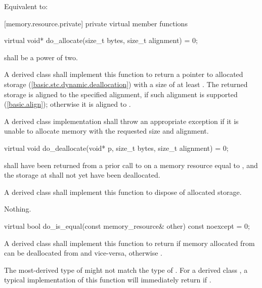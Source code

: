 \begin{itemdescr}
\pnum
\effects
Equivalent to: 
\end{itemdescr}


[memory.resource.private]{ private virtual member functions}

%
\begin{itemdecl}
virtual void* do_allocate(size_t bytes, size_t alignment) = 0;
\end{itemdecl}

\begin{itemdescr}
\pnum
\requires
{} shall be a power of two.

\pnum
\returns
A derived class shall implement this function to return a pointer to allocated storage (\ref{basic.stc.dynamic.deallocation}) with a size of at least .
The returned storage is aligned to the specified alignment, if such alignment is supported (\ref{basic.align});
otherwise it is aligned to .

\pnum
\throws
A derived class implementation shall throw an appropriate exception if it is unable to allocate memory with the requested size and alignment.
\end{itemdescr}

%
\begin{itemdecl}
virtual void do_deallocate(void* p, size_t bytes, size_t alignment) = 0;
\end{itemdecl}

\begin{itemdescr}
\pnum
\requires
{} shall have been returned from a prior call to  on a memory resource equal to ,
and the storage at  shall not yet have been deallocated.

\pnum
\effects
A derived class shall implement this function to dispose of allocated storage.

\pnum
\throws
Nothing.
\end{itemdescr}

%
\begin{itemdecl}
virtual bool do_is_equal(const memory_resource& other) const noexcept = 0;
\end{itemdecl}

\begin{itemdescr}
\pnum
\returns
A derived class shall implement this function to return  if memory allocated from  can be deallocated from  and vice-versa,
otherwise .
\begin{note}
The most-derived type of  might not match the type of .
For a derived class , a typical implementation of this function
will immediately return 
if .\end{note}
\end{itemdescr}

